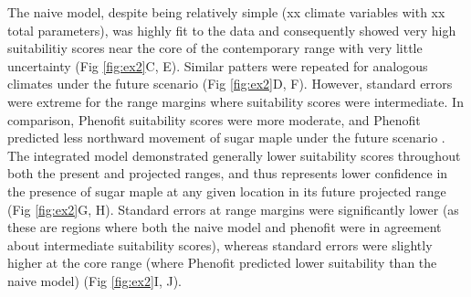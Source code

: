 The naive model, despite being relatively simple (xx climate variables with xx total parameters), was highly fit to the data and consequently showed very high suitabilitiy scores near the core of the contemporary range with very little uncertainty (Fig \ref{fig:ex2}C, E).
Similar patters were repeated for analogous climates under the future scenario (Fig \ref{fig:ex2}D, F).
However, standard errors were extreme for the range margins where suitability scores were intermediate.
In comparison, Phenofit suitability scores were more moderate, and Phenofit predicted less northward movement of sugar maple under the future scenario \citep[Fig. \ref{fig:ex2}A, B,][]{Morin2009}.
The integrated model demonstrated generally lower suitability scores throughout both the present and projected ranges, and thus represents lower confidence in the presence of sugar maple at any given location in its future projected range (Fig \ref{fig:ex2}G, H).
Standard errors at range margins were significantly lower (as these are regions where both the naive model and phenofit were in agreement about intermediate suitability scores), whereas standard errors were slightly higher at the core range (where Phenofit predicted lower suitability than the naive model) (Fig \ref{fig:ex2}I, J).


